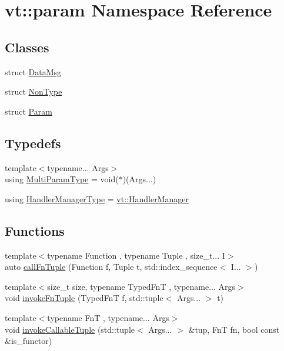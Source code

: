 \hypertarget{namespacevt_1_1param}{}\section{vt\+:\+:param Namespace Reference}
\label{namespacevt_1_1param}
\subsection*{Classes}
\begin{DoxyCompactItemize}
\item 
struct \hyperlink{structvt_1_1param_1_1_data_msg}{Data\+Msg}
\item 
struct \hyperlink{structvt_1_1param_1_1_non_type}{Non\+Type}
\item 
struct \hyperlink{structvt_1_1param_1_1_param}{Param}
\end{DoxyCompactItemize}
\subsection*{Typedefs}
\begin{DoxyCompactItemize}
\item 
{\footnotesize template$<$typename... Args$>$ }\\using \hyperlink{namespacevt_1_1param_ada9e92f75ab7e859947a8ffe5bae6c5b}{Multi\+Param\+Type} = void($\ast$)(Args...)
\item 
using \hyperlink{namespacevt_1_1param_ad9561687e11201a35ed8aba0b666c0b4}{Handler\+Manager\+Type} = \hyperlink{structvt_1_1_handler_manager}{vt\+::\+Handler\+Manager}
\end{DoxyCompactItemize}
\subsection*{Functions}
\begin{DoxyCompactItemize}
\item 
{\footnotesize template$<$typename Function , typename Tuple , size\+\_\+t... I$>$ }\\auto \hyperlink{namespacevt_1_1param_abc9c93cc76336669a28b64f562dd78a3}{call\+Fn\+Tuple} (Function f, Tuple t, std\+::index\+\_\+sequence$<$ I... $>$)
\item 
{\footnotesize template$<$size\+\_\+t size, typename Typed\+FnT , typename... Args$>$ }\\void \hyperlink{namespacevt_1_1param_a8df465cc087697f52404eddfada30574}{invoke\+Fn\+Tuple} (Typed\+FnT f, std\+::tuple$<$ Args... $>$ t)
\item 
{\footnotesize template$<$typename FnT , typename... Args$>$ }\\void \hyperlink{namespacevt_1_1param_a3aec8e4301c9035e3333fe9d186171fe}{invoke\+Callable\+Tuple} (std\+::tuple$<$ Args... $>$ \&tup, FnT fn, bool const \&is\+\_\+functor)
\end{DoxyCompactItemize}


